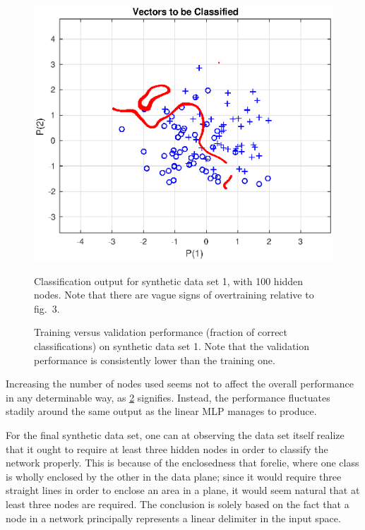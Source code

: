 \documentclass[a4paper,12pt]{article}
\theoremstyle{plain}
\theoremstyle{definition}
\begin{document}
\begin{figure}[H]
\begin{minipage}[t]{.6\textwidth}
            \includegraphics[scale=.6]{8_100_nodes}
            \label{fig:8_100_nodes}
            \caption{Classification output for synthetic data set 1, with 100
            hidden nodes. Note that there are vague signs of overtraining relative to
            fig.~3.}
         \end{minipage}
      \end{figure}
      
      \begin{figure}[H]
         \centering
         \resizebox{.7\textwidth}{!}{}
         \caption{Training versus validation performance (fraction of correct
         classifications) on synthetic data set 1. Note that the validation
         performance is consistently lower than the training one.}
         \label{fig:7_and_8_comp}            
      \end{figure}
      
      Increasing the number of nodes used seems not to affect the overall
      performance in any determinable way, as \cref{fig:7_and_8_comp} signifies.
      Instead, the performance fluctuates stadily around the same output as the
      linear MLP manages to produce.

      For the final synthetic data set, one can at observing the data set
      itself realize that it ought to require at least three hidden nodes in order
      to classify the network properly. This is because of the enclosedness that
      forelie, where one class is wholly enclosed by the other in the data
      plane; since it would require three straight lines in order to enclose
      an area in a plane, it would seem natural that at least three nodes are
      required. The conclusion is solely based on the fact that a node in a
      network principally represents a linear delimiter in the input space.
      
\end{document}
